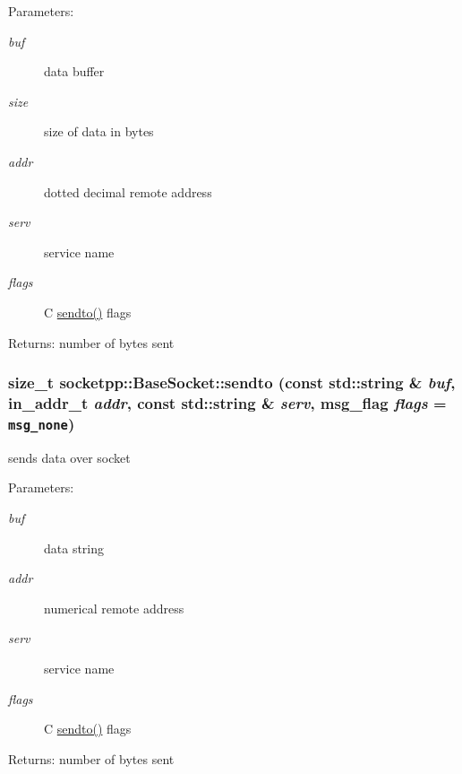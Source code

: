 \begin{CompactItemize}
\begin{Desc}
\item[Parameters:]
\begin{description}
\item[{\em buf}]data buffer \item[{\em size}]size of data in bytes \item[{\em addr}]dotted decimal remote address \item[{\em serv}]service name \item[{\em flags}]C \hyperlink{classsocketpp_1_1BaseSocket_d6df36281c6fce81e5c4c493ac91a6f8}{sendto()} flags \end{description}
\end{Desc}
\begin{Desc}
\item[Returns:]number of bytes sent \end{Desc}
\hypertarget{classsocketpp_1_1BaseSocket_8ffad80d557d9d77e681742c177522f2}{
\subsubsection[{sendto}]{\setlength{\rightskip}{0pt plus 5cm}size\_\-t socketpp::BaseSocket::sendto (const std::string \& {\em buf}, \/  in\_\-addr\_\-t {\em addr}, \/  const std::string \& {\em serv}, \/  msg\_\-flag {\em flags} = {\tt msg\_\-none})}}
\label{classsocketpp_1_1BaseSocket_8ffad80d557d9d77e681742c177522f2}


sends data over socket 

\begin{Desc}
\item[Parameters:]
\begin{description}
\item[{\em buf}]data string \item[{\em addr}]numerical remote address \item[{\em serv}]service name \item[{\em flags}]C \hyperlink{classsocketpp_1_1BaseSocket_d6df36281c6fce81e5c4c493ac91a6f8}{sendto()} flags \end{description}
\end{Desc}
\begin{Desc}
\item[Returns:]number of bytes sent \end{Desc}
\hypertarget{classsocketpp_1_1BaseSocket_ca4c0bbe94058654d01b82d517c9c590}{
}
\end{CompactItemize}
